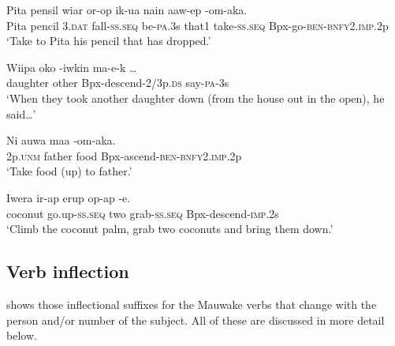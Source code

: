\ea%
\label{ex:x430}
\gll Pita pensil wiar or-op ik-ua nain aaw-ep -om-aka.\\
Pita pencil 3.\textsc{dat} fall-\textsc{ss}.\textsc{seq} be-\textsc{pa}.3s that1 take-\textsc{ss}.\textsc{seq} Bpx-go-\textsc{ben}-\textsc{bnfy}2.\textsc{imp}.2p\\
\glt`Take to Pita his pencil that has dropped.'
\z

\ea%
\label{ex:x222}
\gll Wiipa oko -iwkin ma-e-k {\dots} \\
daughter other Bpx-descend-2/3p.\textsc{ds} say-\textsc{pa}-3s \\
\glt`When they took another daughter down (from the house out in the open), he said{\dots}' 
\z

\ea%
\label{ex:x223}
\gll Ni auwa maa -om-aka. \\
2p.\textsc{unm} father food Bpx-ascend-\textsc{ben}-\textsc{bnfy}2.\textsc{imp}.2p \\
\glt`Take food (up) to father.'
\z

\ea%
\label{ex:x224}
\gll Iwera ir-ap erup op-ap -e. \\
coconut go.up-\textsc{ss}.\textsc{seq} two grab-\textsc{ss}.\textsc{seq} Bpx-descend-\textsc{imp}.2s \\
\glt`Climb the coconut palm, grab two coconuts and bring them down.' 
\z

\subsection{Verb inflection} 
{}
 shows those inflectional suffixes for the Mauwake verbs that change with the person and/or number of the subject. All of these are discussed in more detail below.

